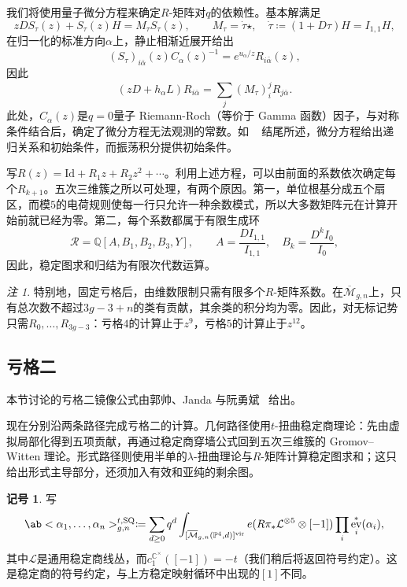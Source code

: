 \documentclass{amsart}
\theoremstyle{definition}
\newtheorem{notn}[thm]{记号}
\theoremstyle{remark}
\newtheorem{rmk}[thm]{注}
\theoremstyle{plain}
\theoremstyle{definition}
\theoremstyle{remark}
\newcommand{\C}{\mathbb{C}}
\newcommand{\Q}{\mathbb{Q}}
\renewcommand{\P}{\mathbb{P}}
\newcommand{\Mbar}{\overline{\mathcal{M}}}
\newcommand{\mc}[1]{\mathcal{#1}}
\newcommand{\mr}[1]{\mathrm{#1}}
\newcommand{\1}{\mathbf{1}}
\newcommand{\2}{\mathbf{2}}
\newcommand{\3}{\mathbf{3}}
\newcommand{\vir}{\mr{vir}}
\DeclareMathOperator{\ev}{ev}
\begin{document}
我们将使用量子微分方程来确定\(R\)-矩阵对\(q\)的依赖性。基本解满足
\[ zDS_{\tau}(z) + S_{\tau}(z)H = M_{\tau}S_{\tau}(z), \qquad M_{\tau} = \dot{\tau}\star, \quad \dot{\tau} \coloneqq (1+D\tau)H = I_{1,1}H, \]
在归一化的标准方向\(\alpha\)上，静止相渐近展开给出
\[ (S_{\tau})_{i\bar{\alpha}}(z)C_{\alpha}(z)^{-1} = e^{u_{\alpha}/z}R_{i\bar{\alpha}}(z), \]
因此
\[ (zD+h_{\alpha}L)R_{i\bar{\alpha}} = \sum_j (M_{\tau})_i^j R_{j\bar{\alpha}}. \]
此处，\(C_{\alpha}(z)\)是\(q=0\)量子 Riemann-Roch（等价于 Gamma 函数）因子，与对称条件结合后，确定了微分方程无法观测的常数。如 ~ 结尾所述，微分方程给出递归关系和初始条件，而振荡积分提供初始条件。

写\(R(z) = \mr{Id} + R_1 z + R_2 z^2 + \cdots\)。利用上述方程，可以由前面的系数依次确定每个\(R_{k+1}\)。五次三维簇之所以可处理，有两个原因。第一，单位根基分成五个扇区，而模\(5\)的电荷规则使每一行只允许一种余数模式，所以大多数矩阵元在计算开始前就已经为零。第二，每个系数都属于有限生成环
\[ \mc{R} = \Q[A,B_1,B_2,B_3,Y], \qquad A = \frac{DI_{1,1}}{I_{1,1}}, \quad B_k = \frac{D^k I_0}{I_0}, \]
因此，稳定图求和归结为有限次代数运算。

\begin{rmk}
    特别地，固定亏格后，由维数限制只需有限多个\(R\)-矩阵系数。在\(\Mbar_{g,n}\)上，只有总次数不超过\(3g-3+n\)的类有贡献，其余类的积分均为零。因此，对无标记势只需\(R_0, \ldots, R_{3g-3}\)：亏格\(4\)的计算止于\(z^9\)，亏格\(5\)的计算止于\(z^{12}\)。
\end{rmk}

\subsection{亏格二}%
\label{sub:Genus two}

本节讨论的亏格二镜像公式由郭帅、Janda 与阮勇斌~\cite{GJRgenus2} 给出。

现在分别沿两条路径完成亏格二的计算。几何路径使用\(t\)-扭曲稳定商理论：先由虚拟局部化得到五项贡献，再通过稳定商穿墙公式回到五次三维簇的 Gromov--Witten 理论。形式路径则使用半单的\(\lambda\)-扭曲理论与\(R\)-矩阵计算稳定图求和；这只给出形式主导部分，还须加入有效和亚纯的剩余图。

\begin{notn}
写
    \[ \ab<\alpha_1, \ldots, \alpha_n>^{t,\mr{SQ}}_{g,n} \coloneqq \sum_{d\geq0}q^d \int_{[\Mbar_{g,n}(\P^4,d)]^{\vir}}e(R\pi_*\mc{L}^{\otimes 5}\otimes[-1])\prod_i \ev_i^*(\alpha_i), \]
其中\(\mc{L}\)是通用稳定商线丛，而\(c_1^{\C^{\times}}([-1]) = -t\)（我们稍后将返回符号约定）。这是稳定商的符号约定，与上方稳定映射循环中出现的\([1]\)不同。
\end{notn}
\end{document}
